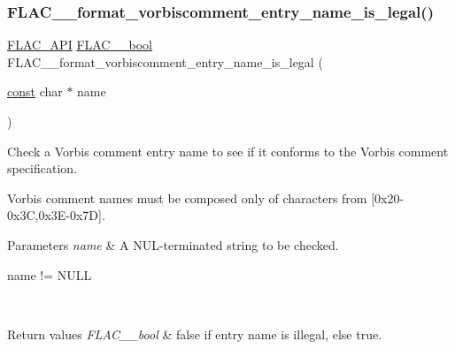 \subsubsection{\texorpdfstring{F\+L\+A\+C\+\_\+\+\_\+format\+\_\+vorbiscomment\+\_\+entry\+\_\+name\+\_\+is\+\_\+legal()}{FLAC\_\_format\_vorbiscomment\_entry\_name\_is\_legal()}}
{\footnotesize\ttfamily \hyperlink{group__flac__export_ga56ca07df8a23310707732b1c0007d6f5}{F\+L\+A\+C\+\_\+\+A\+PI} \hyperlink{ordinals_8h_a95103469f1cbd78b8cf250194985b34e}{F\+L\+A\+C\+\_\+\+\_\+bool} F\+L\+A\+C\+\_\+\+\_\+format\+\_\+vorbiscomment\+\_\+entry\+\_\+name\+\_\+is\+\_\+legal (\begin{DoxyParamCaption}\item[{\hyperlink{zconf_8h_a2c212835823e3c54a8ab6d95c652660e}{const} char $\ast$}]{name }\end{DoxyParamCaption})}

Check a Vorbis comment entry name to see if it conforms to the Vorbis comment specification.

Vorbis comment names must be composed only of characters from \mbox{[}0x20-\/0x3C,0x3\+E-\/0x7D\mbox{]}.


\begin{DoxyParams}{Parameters}
{\em name} & A N\+U\+L-\/terminated string to be checked.  
\begin{DoxyCode}
name != NULL 
\end{DoxyCode}
 \\
\hline
\end{DoxyParams}

\begin{DoxyRetVals}{Return values}
{\em F\+L\+A\+C\+\_\+\+\_\+bool} & {\ttfamily false} if entry name is illegal, else {\ttfamily true}. \\
\hline
\end{DoxyRetVals}
\mbox{\label{group__flac__format_gae0707c9d46b2af02f1e145bdae331605}} 
